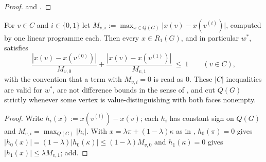 \begin{proof}
 and .
\end{proof}

\begin{corollary}\label{cl:cut}
For $v\in C$ and $i\in\{0,1\}$ let
$M_{v,i}:=\max_{x\in Q(G)}\bigl|x(v)-x(v^{(i)})\bigr|$, computed by one linear
programme each. Then every $x\in R_1(G)$, and in particular $w^{\ast}$,
satisfies
\[
  \frac{|x(v)-x(v^{(0)})|}{M_{v,0}}+\frac{|x(v)-x(v^{(1)})|}{M_{v,1}}\ \le\ 1
  \qquad(v\in C),
\]
with the convention that a term with $M_{v,i}=0$ is read as $0$. These $|C|$
inequalities are valid for $w^{\ast}$, are not difference bounds in the sense
of , and cut $Q(G)$ strictly whenever some vertex is
value-distinguishing with both faces nonempty.
\end{corollary}

\begin{proof}
Write $h_i(x):=x(v^{(i)})-x(v)$; each $h_i$ has constant sign on $Q(G)$ and
$M_{v,i}=\max_{Q(G)}|h_i|$. With $x=\lambda\pi+(1-\lambda)\kappa$ as in
, $h_0(\pi)=0$ gives $|h_0(x)|=(1-\lambda)|h_0(\kappa)|\le
(1-\lambda)M_{v,0}$ and $h_1(\kappa)=0$ gives
$|h_1(x)|\le\lambda M_{v,1}$; add.
\end{proof}


